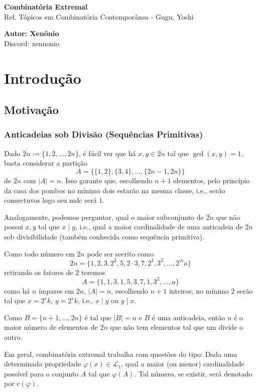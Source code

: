 \documentclass[11pt]{article}
\newcommand{\mc}[1]{\mathcal{#1}}
\newcommand{\ol}[1]{\overline{#1}}
\begin{document}
\thispagestyle{empty}

\begin{center}
{\LARGE \bf Combinatória Extremal}\\
{\large Ref. Tópicos em Combinatória Contemporânea - Gugu, Yoshi}

\vspace{0.7cm}
\textbf{Autor: Xenônio}\\
Discord: xennonio
\end{center}

\tableofcontents

\section{Introdução}

\subsection{Motivação}

\subsubsection{Anticadeias sob Divisão (Sequências Primitivas)}

Dado $\ol{2n}:=\{1, 2, \dots, 2n\}$, é fácil ver que há $x,y\in\ol{2n}$ tal que $\gcd(x,y)=1$, basta considerar a partição
$$A=\{\{1,2\},\{3,4\},\dots,\{2n-1,2n\}\}$$
de $\ol{2n}$ com $|A|=n$. Isso garante que, escolhendo $n+1$ elementos, pelo princípio da casa dos pombos no mínimo dois estarão na mesma classe, i.e., serão consectuvos logo seu mdc será $1$.

Analogamente, podemos perguntar, qual o maior subconjunto de $\ol{2n}$ que não possui $x,y$ tal que $x\mid y$, i.e., qual a maior cardinalidade de uma anticadeia de $\ol{2n}$ sob divisibilidade (também conhecida como sequência primitiva).

Como todo número em $\ol{2n}$ pode ser secrito como
$$\ol{2n}=\{1,2,3,2^2,5,2\cdot3,7,2^3,3^2,\dots,2^ma\}$$
retirando os fatores de $2$ teremos
$$A=\{1, 1, 3, 1, 5, 3, 7, 1, 3^2,\dots,a\}$$
como há $n$ ímpares em $2n$, $|A|=n$, escolhendo $n+1$ inteiros, no mínimo $2$ serão tal que $x=2^rk$, $y=2^sk$, i.e., $x\mid y$ ou $y\mid x$.

Como $B=\{n+1,\dots,2n\}$ é tal que $|B|=n$ e $B$ é uma anticadeia, então $n$ é o maior número de elementos de $\ol{2n}$ que não tem elementos tal que um divide o outro.

Em geral, combinatória extremal trabalha com questões do tipo: Dada uma determinada propriedade $\varphi(x)\in\mc{L}_1$, qual a maior (ou menor) cardinalidade possível para o conjunto $A$ tal que $\varphi(A)$. Tal número, se existir, será denotado por $c(\varphi)$.
\end{document}
